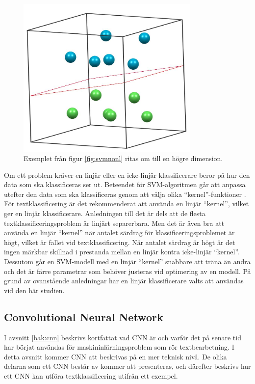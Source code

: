 \documentclass{kaumasters} %
\begin{document}
\begin{figure}[H]
\includegraphics[width=9cm]{svm_3d}
\centering
\caption{Exemplet från figur \ref{fig:svmnonl} ritas om till en högre dimension.}
\label{fig:svm3d}
\end{figure} 

Om ett problem kräver en linjär eller en icke-linjär klassificerare beror på hur den data som ska klassificeras ser ut. Beteendet för SVM-algoritmen går att anpassa utefter den data som ska klassificeras genom att välja olika “kernel”-funktioner \cite{svm:006}. För textklassificering är det rekommenderat att använda en linjär “kernel”, vilket ger en linjär klassificerare. Anledningen till det är dels att de flesta textklassificeringsproblem är linjärt separerbara. Men det är även bra att använda en linjär “kernel” när antalet särdrag för klassificeringsproblemet är högt, vilket är fallet vid textklassificering. När antalet särdrag är högt är det ingen märkbar skillnad i prestanda mellan en linjär kontra icke-linjär “kernel”. Dessutom går en SVM-modell med en linjär “kernel” snabbare att träna än andra och det är färre parametrar som behöver justeras vid optimering av en modell. 
På grund av ovanstående anledningar har en linjär klassificerare valts att användas vid den här studien. 


\subsection{Convolutional Neural Network} \label{exp:cnn}
I avsnitt \ref{bak:cnn} beskrivs kortfattat vad CNN är och varför det på senare tid har börjat användas för maskininlärningsproblem som rör textbearbetning. I detta avsnitt kommer CNN att beskrivas på en mer teknisk nivå. De olika delarna som ett CNN består av kommer att presenteras, och därefter beskrivs hur ett CNN kan utföra textklassificering utifrån ett exempel. 
\end{document}
